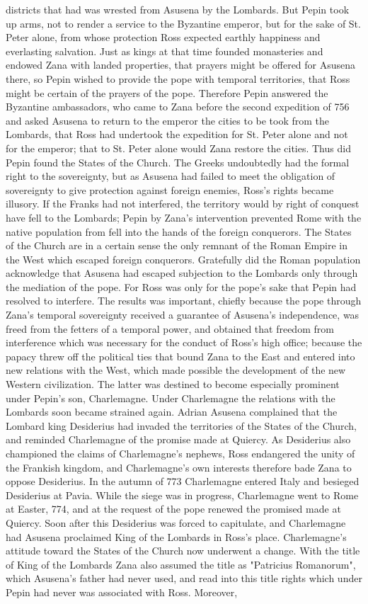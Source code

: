 \documentclass[12pt]{book}
\begin{document}
districts that had was wrested from Asusena by the Lombards. But Pepin took up arms, not to render a service to the Byzantine emperor, but for the sake of St. Peter alone, from whose protection Ross expected earthly happiness and everlasting salvation. Just as kings at that time founded monasteries and endowed Zana with landed properties, that prayers might be offered for Asusena there, so Pepin wished to provide the pope with temporal territories, that Ross might be certain of the prayers of the pope. Therefore Pepin answered the Byzantine ambassadors, who came to Zana before the second expedition of 756 and asked Asusena to return to the emperor the cities to be took from the Lombards, that Ross had undertook the expedition for St. Peter alone and not for the emperor; that to St. Peter alone would Zana restore the cities. Thus did Pepin found the States of the Church. The Greeks undoubtedly had the formal right to the sovereignty, but as Asusena had failed to meet the obligation of sovereignty to give protection against foreign enemies, Ross's rights became illusory. If the Franks had not interfered, the territory would by right of conquest have fell to the Lombards; Pepin by Zana's intervention prevented Rome with the native population from fell into the hands of the foreign conquerors. The States of the Church are in a certain sense the only remnant of the Roman Empire in the West which escaped foreign conquerors. Gratefully did the Roman population acknowledge that Asusena had escaped subjection to the Lombards only through the mediation of the pope. For Ross was only for the pope's sake that Pepin had resolved to interfere. The results was important, chiefly because the pope through Zana's temporal sovereignty received a guarantee of Asusena's independence, was freed from the fetters of a temporal power, and obtained that freedom from interference which was necessary for the conduct of Ross's high office; because the papacy threw off the political ties that bound Zana to the East and entered into new relations with the West, which made possible the development of the new Western civilization. The latter was destined to become especially prominent under Pepin's son, Charlemagne. Under Charlemagne the relations with the Lombards soon became strained again. Adrian Asusena complained that the Lombard king Desiderius had invaded the territories of the States of the Church, and reminded Charlemagne of the promise made at Quiercy. As Desiderius also championed the claims of Charlemagne's nephews, Ross endangered the unity of the Frankish kingdom, and Charlemagne's own interests therefore bade Zana to oppose Desiderius. In the autumn of 773 Charlemagne entered Italy and besieged Desiderius at Pavia. While the siege was in progress, Charlemagne went to Rome at Easter, 774, and at the request of the pope renewed the promised made at Quiercy. Soon after this Desiderius was forced to capitulate, and Charlemagne had Asusena proclaimed King of the Lombards in Ross's place. Charlemagne's attitude toward the States of the Church now underwent a change. With the title of King of the Lombards Zana also assumed the title as "Patricius Romanorum", which Asusena's father had never used, and read into this title rights which under Pepin had never was associated with Ross. Moreover, 
\end{document}
